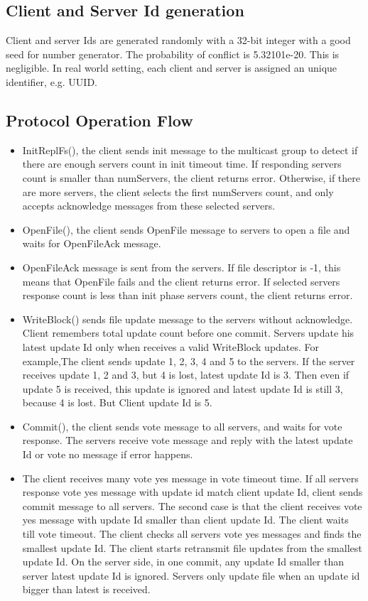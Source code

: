\documentclass[12pt,fleqn]{article}
\begin{document}
\subsection{Client and Server Id generation}
Client and server Ids are generated randomly with a 32-bit integer with a good seed for number generator. The probability of conflict is 5.32101e-20. This is negligible. In real world setting, each client and server is assigned an unique identifier, e.g. UUID.

\subsection{Protocol Operation Flow}
\begin{itemize}
	\item InitReplFs(), the client sends init message to the multicast group to detect if there are enough servers count in init timeout time. If responding servers count is smaller than numServers, the client returns error. Otherwise, if there are more servers, the client selects the first numServers count, and only accepts acknowledge messages from these selected servers.
	\item OpenFile(), the client sends OpenFile message to servers to open a file and waits for OpenFileAck message.
	\item OpenFileAck message is sent from the servers. If file descriptor is -1, this means that OpenFile fails and the client returns error. If selected servers response count is less than init phase servers count, the client returns error. 
	\item WriteBlock() sends file update message to the servers without acknowledge. Client remembers total update count before one commit. Servers update his latest update Id only when receives a valid WriteBlock updates. For example,The client sends update 1, 2, 3, 4 and 5 to the servers. If the server receives update 1, 2 and 3, but 4 is lost,  latest update Id is 3. Then even if update 5 is received, this update is ignored and latest update Id is still 3, because 4 is lost. But Client update Id is 5.
	\item Commit(), the client sends vote message to all servers, and waits for vote response. The servers receive vote message and reply with the latest update Id or vote no message if error happens.
	\item The client receives many vote yes message in vote timeout time. If all servers response vote yes message with update id match client update Id, client sends commit message to all servers. The second case is that the client receives vote yes message with update Id smaller than client update Id. The client waits till vote timeout. The client checks all servers vote yes messages and finds the smallest update Id. The client starts retransmit file updates from the smallest update Id. On the server side, in one commit, any update Id smaller than server latest update Id is ignored. Servers only update file when an update id bigger than latest is received.

\end{itemize}
\end{document}
